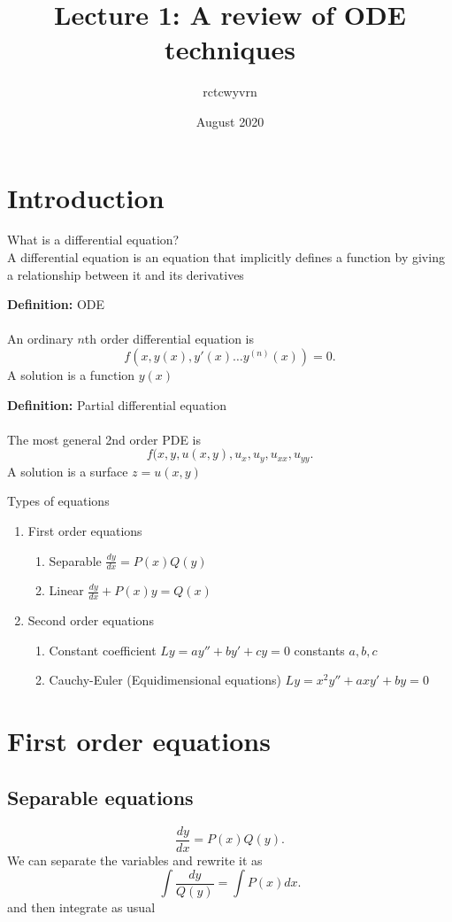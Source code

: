 \documentclass{article}
\title{Lecture 1: A review of ODE techniques}
\author{rctcwyvrn }
\date{August 2020}
\begin{document}
\maketitle


\section{Introduction}

What is a differential equation? \\
A differential equation is an equation that implicitly defines a function by giving a relationship between it and its derivatives

\begin{definition} 
\textbf{Definition:} ODE \\
~\\
An ordinary $n$th order differential equation is \[
f(x, y(x), y'(x) \ldots y^{(n)}(x)) = 0 
.\]
A solution is a function $y(x)$
\end{definition}
\begin{definition} 
\textbf{Definition:} Partial differential equation \\
~\\
The most general 2nd order PDE is \[
	f(x,y, u(x,y), u_x, u_y, u_{x x}, u_{yy}
.\] 
A solution is a surface $z =u(x,y)$
\end{definition}

Types of equations 
\begin{enumerate}
	\item First order equations
	\begin{enumerate}
		\item Separable $\frac{dy}{dx} = P(x)Q(y)$
		\item Linear $\frac{dy}{dx} + P(x)y = Q(x)$
	\end{enumerate}
	\item Second order equations
	\begin{enumerate}
		\item Constant coefficient $Ly = ay''+ by' + cy = 0$ constants $a,b,c$
		\item Cauchy-Euler (Equidimensional equations) $Ly = x^2y'' + axy' + by = 0$
	\end{enumerate}
\end{enumerate}
\section{First order equations}
\subsection{Separable equations}
\[
	\frac{dy}{dx} = P(x)Q(y)
.\] 
We can separate the variables and rewrite it as 
\[
	\int \frac{dy}{Q(y)} = \int P(x)dx
.\] 
and then integrate as usual
\end{document}
